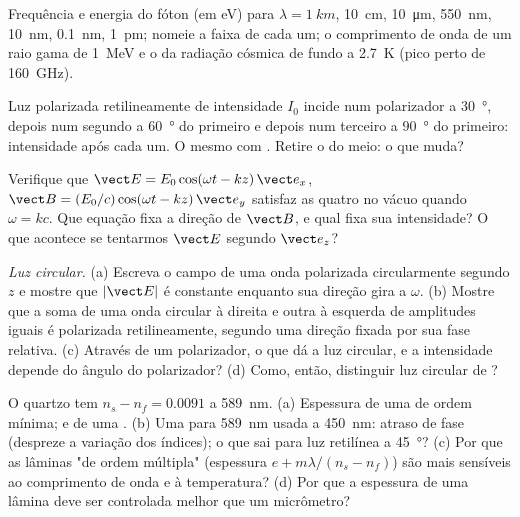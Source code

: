 \begin{exercise}[$\star$]\label{exo:b2:plane-waves-polarization:2}
Frequência e energia do fóton (em eV) para $\lambda = \qty{1}{km}$, \qty{10}{cm},
\qty{10}{\micro m}, \qty{550}{nm}, \qty{10}{nm}, \qty{0.1}{nm}, \qty{1}{pm}; nomeie a
faixa de cada um; o comprimento de onda de um raio gama de \qty{1}{MeV} e o da
radiação cósmica de fundo a \qty{2.7}{K} (pico perto de \qty{160}{GHz}).
\end{exercise}

\begin{exercise}[$\star$]\label{exo:b2:plane-waves-polarization:3}
Luz polarizada retilineamente de intensidade $I_0$ incide num polarizador a
\qty{30}{\degree}, depois num segundo a \qty{60}{\degree} do primeiro e depois num
terceiro a \qty{90}{\degree} do primeiro: intensidade após cada um. O mesmo com
. Retire o do meio: o que muda?
\end{exercise}

\begin{exercise}[$\star$]\label{exo:b2:plane-waves-polarization:4}
Verifique que $\vect E = E_0\cos(\omega t - kz)\,\vect e_x$, $\vect B = (E_0/c)\cos(\omega t
- kz)\,\vect e_y$ satisfaz as quatro  no vácuo quando $\omega =
kc$. Que equação fixa a direção de $\vect B$, e qual fixa sua
intensidade? O que acontece se tentarmos $\vect E$ segundo $\vect e_z$?
\end{exercise}

\begin{exercise}[$\star\star$]\label{exo:b2:plane-waves-polarization:5}
\emph{Luz circular.} (a) Escreva o campo de uma onda polarizada
circularmente segundo $z$ e mostre que $|\vect E|$ é constante enquanto sua direção
gira a $\omega$. (b) Mostre que a soma de uma onda circular à direita e outra à esquerda
de amplitudes iguais é polarizada retilineamente, segundo uma direção fixada por
sua fase relativa. (c) Através de um polarizador, o que dá a luz circular,
e a intensidade depende do ângulo do polarizador? (d) Como,
então, distinguir luz circular de ?
\end{exercise}

\begin{exercise}[$\star\star$]\label{exo:b2:plane-waves-polarization:6}
O quartzo tem $n_s - n_f = 0.0091$ a \qty{589}{nm}. (a) Espessura de uma
 de ordem mínima; e de uma . (b) Uma
 para \qty{589}{nm} usada a \qty{450}{nm}: atraso de fase
(despreze a variação dos índices); o que sai para luz retilínea
a \qty{45}{\degree}? (c) Por que as lâminas "de ordem múltipla" (espessura $e +
m\lambda/(n_s - n_f)$) são mais sensíveis ao comprimento de onda e à temperatura? (d) Por que
a espessura de uma lâmina deve ser controlada melhor que um micrômetro?
\end{exercise}

